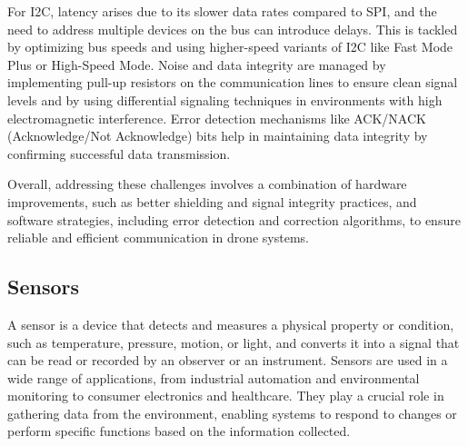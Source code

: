 \documentclass{article}
\begin{document}
For I2C, latency arises due to its slower data rates compared to SPI, and the need to address multiple devices on the bus can introduce delays. This is tackled by optimizing bus speeds and using higher-speed variants of I2C like Fast Mode Plus or High-Speed Mode. Noise and data integrity are managed by implementing pull-up resistors on the communication lines to ensure clean signal levels and by using differential signaling techniques in environments with high electromagnetic interference. Error detection mechanisms like ACK/NACK (Acknowledge/Not Acknowledge) bits help in maintaining data integrity by confirming successful data transmission.

Overall, addressing these challenges involves a combination of hardware improvements, such as better shielding and signal integrity practices, and software strategies, including error detection and correction algorithms, to ensure reliable and efficient communication in drone systems.
\cite{CompComms2023}

\subsection{Sensors}

A sensor is a device that detects and measures a physical property or condition, such as temperature, pressure, motion, or light, and converts it into a signal that can be read or recorded by an observer or an instrument. Sensors are used in a wide range of applications, from industrial automation and environmental monitoring to consumer electronics and healthcare. They play a crucial role in gathering data from the environment, enabling systems to respond to changes or perform specific functions based on the information collected.
\end{document}
